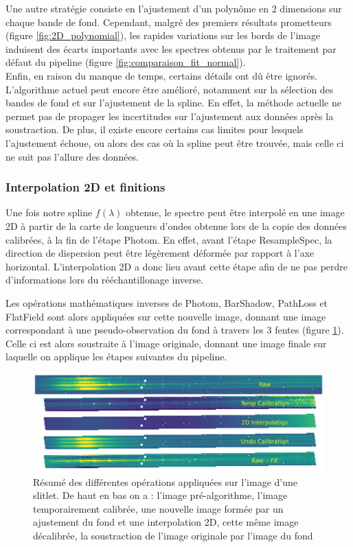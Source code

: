 \documentclass[11pt, a4paper]{article}
\begin{document}
Une autre stratégie consiste en l'ajustement d'un polynôme en 2 dimensions sur chaque bande de fond. Cependant, malgré des premiers résultats prometteurs (figure \ref{fig:2D_polynomial}), les rapides variations sur les bords de l'image induisent des écarts importants avec les spectres obtenus par le traitement par défaut du pipeline (figure \ref{fig:comparaison_fit_normal}).\\

Enfin, en raison du manque de temps, certains détails ont dû être ignorés. L'algorithme actuel peut encore être amélioré, notamment sur la sélection des bandes de fond et sur l'ajustement de la spline. En effet, la méthode actuelle ne permet pas de propager les incertitudes sur l'ajustement aux données après la soustraction. De plus, il existe encore certains cas limites pour lesquels l'ajustement échoue, ou alors des cas où la spline peut être trouvée, mais celle ci ne suit pas l'allure des données.


\subsubsection{Interpolation 2D et finitions}

Une fois notre spline $f(\lambda)$ obtenue, le spectre peut être interpolé en une image 2D à partir de la carte de longueurs d'ondes obtenue lors de la copie des données calibrées, à la fin de l'étape Photom. En effet, avant l'étape ResampleSpec, la direction de dispersion peut être légèrement déformée par rapport à l'axe horizontal. L'interpolation 2D a donc lieu avant cette étape afin de ne pas perdre d'informations lors du rééchantillonage inverse.

Les opérations mathématiques inverses de Photom, BarShadow, PathLoss et FlatField sont alors appliquées sur cette nouvelle image, donnant une image correspondant à une pseudo-observation du fond à travers les 3 fentes (figure \ref{fig:background}). Celle ci est alors soustraite à l'image originale, donnant une image finale sur laquelle on applique les étapes suivantes du pipeline.

\begin{figure}[H]
  \centering
  \includegraphics[scale=0.5]{assets/background_subtraction.png}
  \caption{Résumé des différentes opérations appliquées sur l'image d'une slitlet. De haut en bas on a : l'image pré-algorithme, l'image temporairement calibrée, une nouvelle image formée par un ajustement du fond et une interpolation 2D, cette même image décalibrée, la soustraction de l'image originale par l'image du fond}
  \label{fig:background}
\end{figure}
\end{document}

